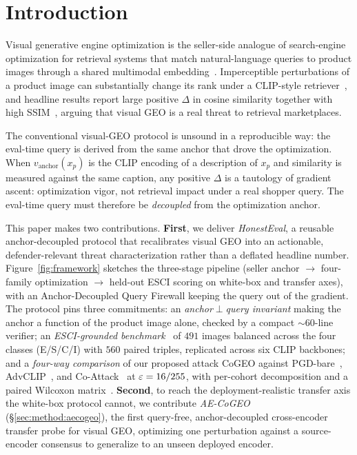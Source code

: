 \section{Introduction}
\label{sec:intro}

Visual generative engine optimization is the seller-side analogue of search-engine optimization for retrieval systems that match natural-language queries to product images through a shared multimodal embedding~\cite{radford2021clip,aggarwal2023geo}. Imperceptible perturbations of a product image can substantially change its rank under a CLIP-style retriever~\cite{goodfellow2015fgsm,zhou2023advclip,zhang2022coattack}, and headline results report large positive $\Delta$ in cosine similarity together with high SSIM~\cite{wang2004ssim}, arguing that visual GEO is a real threat to retrieval marketplaces.

The conventional visual-GEO protocol is unsound in a reproducible way: the eval-time query is derived from the same anchor that drove the optimization. When $v_{\mathrm{anchor}}(x_p)$ is the CLIP encoding of a description of $x_p$ and similarity is measured against the same caption, any positive $\Delta$ is a tautology of gradient ascent: optimization vigor, not retrieval impact under a real shopper query. The eval-time query must therefore be \emph{decoupled} from the optimization anchor.

This paper makes two contributions. \textbf{First}, we deliver \emph{HonestEval}, a reusable anchor-decoupled protocol that recalibrates visual GEO into an actionable, defender-relevant threat characterization rather than a deflated headline number. Figure~\ref{fig:framework} sketches the three-stage pipeline (seller anchor $\to$ four-family optimization $\to$ held-out ESCI scoring on white-box and transfer axes), with an Anchor-Decoupled Query Firewall keeping the query out of the gradient. The protocol pins three commitments: an \emph{anchor$\perp$query invariant} making the anchor a function of the product image alone, checked by a compact $\sim$60-line verifier; an \emph{ESCI-grounded benchmark}~\cite{reddy2022esci} of $491$ images balanced across the four classes (E/S/C/I) with $560$ paired triples, replicated across six CLIP backbones; and a \emph{four-way comparison} of our proposed attack CoGEO against PGD-bare~\cite{madry2018pgd}, AdvCLIP~\cite{zhou2023advclip}, and Co-Attack~\cite{zhang2022coattack} at $\varepsilon = 16/255$, with per-cohort decomposition and a paired Wilcoxon matrix~\cite{wilcoxon1945individual}. \textbf{Second}, to reach the deployment-realistic transfer axis the white-box protocol cannot, we contribute \emph{AE-CoGEO} (\S\ref{sec:method:aecogeo}), the first query-free, anchor-decoupled cross-encoder transfer probe for visual GEO, optimizing one perturbation against a source-encoder consensus to generalize to an unseen deployed encoder.

